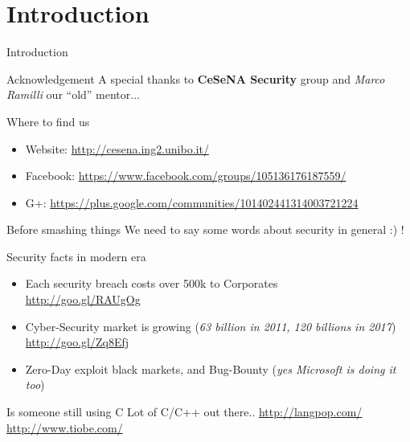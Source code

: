 \section{Introduction}

\begin{frame}{Introduction}

\begin{block}{Acknowledgement}
A special thanks to {\bf CeSeNA Security} group and \emph{Marco Ramilli} our ``old'' mentor...
\end{block}

\begin{block}{Where to find us}
\begin{itemize}
\item Website: {\small \url{http://cesena.ing2.unibo.it/}}
\item Facebook: {\small \url{https://www.facebook.com/groups/105136176187559/} }
\item G+: {\small \url{https://plus.google.com/communities/101402441314003721224}}
\end{itemize}
\end{block}

\framebreak

\begin{block}{Before smashing things}
We need to say some words about security in general :) !
\end{block}

\framebreak

\begin{block}{Security facts in modern era}
\begin{itemize}
\item Each security breach costs over 500k to Corporates\\ 
{\small \url{http://goo.gl/RAUgOg}}
\item Cyber-Security market is growing (\emph{63 billion in 2011, 120 billions in 2017})\\ {\small \url{http://goo.gl/Zq8Efj}}
\item Zero-Day exploit black markets, and Bug-Bounty (\emph{yes Microsoft is doing it too})
\end{itemize}
\end{block}

\framebreak

\begin{block}{Is someone still using C}
Lot of C/C++ out there.. {\small \url{http://langpop.com/}  \url{http://www.tiobe.com/} }
\end{block}


\end{frame}
